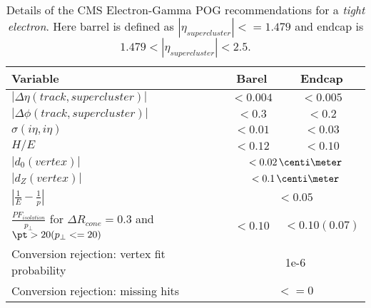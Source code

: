 \begin{table}[htp]
  
\begin{tabular}{|l|c|c|}
\hline
Variable & Barel & Endcap \\
\hline\hline
$| \Delta\eta(track,supercluster) |$                           & $<0.004$ & $<0.005$ \\
$| \Delta\phi(track,supercluster) |$                           & $<0.3  $ & $<0.2  $ \\
$ \sigma(i\eta,i\eta)$                                         & $<0.01 $ & $<0.03 $ \\
$H/E$                                                          & $<0.12 $ & $<0.10 $ \\
\cline{2-3}
$|d_{0}(vertex)|$                                              & \multicolumn{2}{c|}{$<0.02\,\centi\meter$} \\
$|d_{Z}(vertex)|$                                              & \multicolumn{2}{c|}{$<0.1\,\centi\meter$}  \\
$|\frac{1}{E}-\frac{1}{p}| $                                   & \multicolumn{2}{c|}{$<0.05$} \\
\cline{2-3}
$\frac{PF_{isolation}}{p_{\perp}}$ for $ \Delta R_{cone}=0.3$ and $\pt > 20 (p_{\perp} <= 20) $ & $<0.10 $ & $<0.10(0.07)$ \\
\cline{2-3}
Conversion rejection: vertex fit probability                   & \multicolumn{2}{c|}{1e-6}  \\
Conversion rejection: missing hits                             & \multicolumn{2}{c|}{$<=0$} \\
\hline
\end{tabular}
\caption{Details of the \gls{CMS} Electron-Gamma \gls{POG} recommendations for a \textit{tight electron}. Here barrel is defined as $ |\eta_{supercluster}|<=1.479 $ and endcap is $ 1.479 < |\eta_{supercluster}| < 2.5 $.}
\label{TABLE:ParkedDataAnalysis_TightElectronID}
\end{table}
